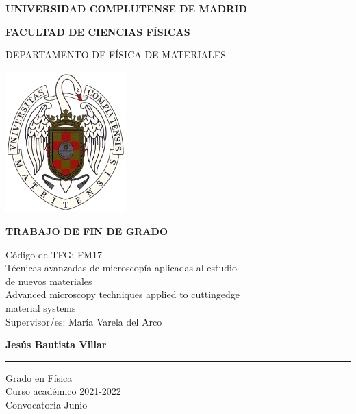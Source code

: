 
\begin{titlepage}
\centering
{ \bfseries \Large UNIVERSIDAD COMPLUTENSE DE MADRID}
\vspace{0.5cm}

{\bfseries  \Large FACULTAD DE CIENCIAS FÍSICAS} 
\vspace{1cm}

{\large DEPARTAMENTO DE FÍSICA DE MATERIALES}
\vspace{0.8cm}

{\includegraphics[width=0.35\textwidth]{fig/logo_UCM.png}}
\vspace{0.8cm}

{\bfseries \Large TRABAJO DE FIN DE GRADO}

\vfill
{\Large Código de TFG:  FM17 } \vspace{5mm} \\
{\Large Técnicas avanzadas de microscopía aplicadas al estudio \\ de nuevos materiales}\vspace{5mm} \\
{\Large Advanced microscopy techniques applied to cuttingedge \\ material systems}\vspace{5mm} \\
{\Large Supervisor/es: María Varela del Arco}\\ 
\vfill

{\bfseries \LARGE Jesús Bautista Villar} \\
\noindent\rule{8cm}{0.4pt}\vspace{5mm}

{\large Grado en Física}\vspace{2.5mm} \\
{\large Curso acad\'emico 2021-2022}\vspace{2.5mm} \\
{\large Convocatoria Junio} \\ 

\end{titlepage}

